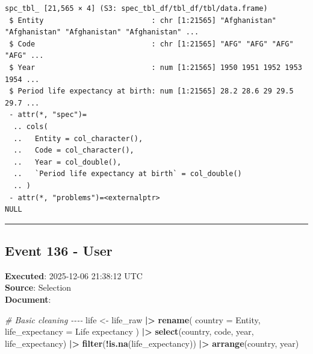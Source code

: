 \documentclass[
  11pt,
]{article}
\newenvironment{Shaded}{\begin{snugshade}}{\end{snugshade}}
\newcommand{\AttributeTok}[1]{\textcolor[rgb]{0.13,0.29,0.53}{#1}}
\newcommand{\CommentTok}[1]{\textcolor[rgb]{0.56,0.35,0.01}{\textit{#1}}}
\newcommand{\FunctionTok}[1]{\textcolor[rgb]{0.13,0.29,0.53}{\textbf{#1}}}
\newcommand{\NormalTok}[1]{#1}
\newcommand{\OtherTok}[1]{\textcolor[rgb]{0.56,0.35,0.01}{#1}}
\newcommand{\SpecialCharTok}[1]{\textcolor[rgb]{0.81,0.36,0.00}{\textbf{#1}}}
\newcommand{\StringTok}[1]{\textcolor[rgb]{0.31,0.60,0.02}{#1}}
\newenvironment{rpoutput}{\vspace{0.5em}\begin{snugshade}}{\end{snugshade}}
\begin{document}
\begin{rpoutput}

\begin{verbatim}
spc_tbl_ [21,565 × 4] (S3: spec_tbl_df/tbl_df/tbl/data.frame)
 $ Entity                         : chr [1:21565] "Afghanistan" "Afghanistan" "Afghanistan" "Afghanistan" ...
 $ Code                           : chr [1:21565] "AFG" "AFG" "AFG" "AFG" ...
 $ Year                           : num [1:21565] 1950 1951 1952 1953 1954 ...
 $ Period life expectancy at birth: num [1:21565] 28.2 28.6 29 29.5 29.7 ...
 - attr(*, "spec")=
  .. cols(
  ..   Entity = col_character(),
  ..   Code = col_character(),
  ..   Year = col_double(),
  ..   `Period life expectancy at birth` = col_double()
  .. )
 - attr(*, "problems")=<externalptr> 
NULL
\end{verbatim}

\end{rpoutput}

\begin{center}\rule{0.5\linewidth}{0.5pt}\end{center}

\subsection{Event 136 - User}\label{event-136---user}

\textbf{Executed}: 2025-12-06 21:38:12 UTC\\
\textbf{Source}: Selection\\
\textbf{Document}:

\begin{Shaded}
\begin{Highlighting}[]
\CommentTok{\# Basic cleaning {-}{-}{-}{-}}
\NormalTok{life }\OtherTok{\textless{}{-}}\NormalTok{ life\_raw }\SpecialCharTok{|\textgreater{}}
  \FunctionTok{rename}\NormalTok{(}
    \AttributeTok{country =}\NormalTok{ Entity,}
    \AttributeTok{life\_expectancy =} \StringTok{\textasciigrave{}}\AttributeTok{Life expectancy}\StringTok{\textasciigrave{}}
\NormalTok{  ) }\SpecialCharTok{|\textgreater{}}
  \FunctionTok{select}\NormalTok{(country, code, year, life\_expectancy) }\SpecialCharTok{|\textgreater{}}
  \FunctionTok{filter}\NormalTok{(}\SpecialCharTok{!}\FunctionTok{is.na}\NormalTok{(life\_expectancy)) }\SpecialCharTok{|\textgreater{}}
  \FunctionTok{arrange}\NormalTok{(country, year)}
\end{Highlighting}
\end{Shaded}
\end{document}
